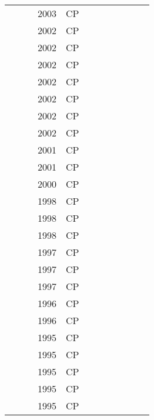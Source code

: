 \documentclass[a4paper]{article}
\begin{document}
{\begin{longtable}{p{3cm}p{6cm}rrcrlcccp{1.5cm}l}
& \href{papers/Vilim03.pdf}{} & \cite{Vilim03} & 2003 & CP & & & & & & & \\
& \href{papers/BeldiceanuC02.pdf}{} & \cite{BeldiceanuC02} & 2002 & CP & & & & & & & \\
& \href{papers/Muscettola02.pdf}{} & \cite{Muscettola02} & 2002 & CP & & & & & & & \\
& \href{papers/KamarainenS02.pdf}{} & \cite{KamarainenS02} & 2002 & CP & & & & & & & \\
& \href{papers/Bartak02.pdf}{} & \cite{Bartak02} & 2002 & CP & & & & & & & \\
& \href{papers/HookerY02.pdf}{} & \cite{HookerY02} & 2002 & CP & & & & & & & \\
& \href{papers/ElkhyariGJ02.pdf}{} & \cite{ElkhyariGJ02} & 2002 & CP & & & & & & & \\
& \href{papers/Vilim02.pdf}{} & \cite{Vilim02} & 2002 & CP & & & & & & & \\
& \href{papers/VerfaillieL01.pdf}{} & \cite{VerfaillieL01} & 2001 & CP & & & & & & & \\
& \href{papers/VanczaM01.pdf}{} & \cite{VanczaM01} & 2001 & CP & & & & & & & \\
& \href{papers/AngelsmarkJ00.pdf}{} & \cite{AngelsmarkJ00} & 2000 & CP & & & & & & & \\
& \href{papers/RodosekW98.pdf}{} & \cite{RodosekW98} & 1998 & CP & & & & & & & \\
& \href{papers/CestaOS98.pdf}{} & \cite{CestaOS98} & 1998 & CP & & & & & & & \\
& \href{papers/FrostD98.pdf}{} & \cite{FrostD98} & 1998 & CP & & & & & & & \\
& \href{papers/Caseau97.pdf}{} & \cite{Caseau97} & 1997 & CP & & & & & & & \\
& \href{papers/BaptisteP97.pdf}{} & \cite{BaptisteP97} & 1997 & CP & & & & & & & \\
& \href{papers/BeckDF97.pdf}{} & \cite{BeckDF97} & 1997 & CP & & & & & & & \\
& \href{papers/Colombani96.pdf}{} & \cite{Colombani96} & 1996 & CP & & & & & & & \\
& \href{papers/Zhou96.pdf}{} & \cite{Zhou96} & 1996 & CP & & & & & & & \\
& \href{papers/SimonisC95.pdf}{} & \cite{SimonisC95} & 1995 & CP & & & & & & & \\
& \href{papers/Goltz95.pdf}{} & \cite{Goltz95} & 1995 & CP & & & & & & & \\
& \href{papers/Simonis95.pdf}{} & \cite{Simonis95} & 1995 & CP & & & & & & & \\
& \href{papers/Puget95.pdf}{} & \cite{Puget95} & 1995 & CP & & & & & & & \\
& \href{papers/Touraivane95.pdf}{} & \cite{Touraivane95} & 1995 & CP & & & & & & & \\


\end{longtable}}
\end{document}
